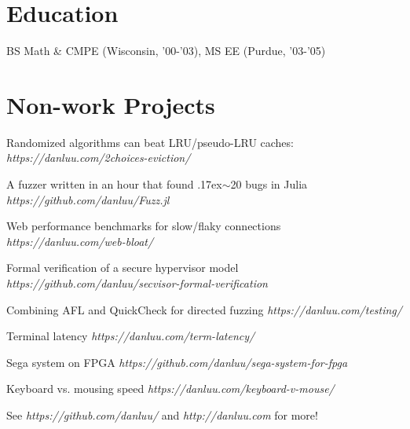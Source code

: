 \documentclass[letterpaper]{scrartcl}
\begin{document}
\section*{Education}
\begin{list1}
\item
  \begin{tabular1bold}BS Math \& CMPE (Wisconsin, '00-'03), MS EE (Purdue, '03-'05)\end{tabular1bold}
\end{list1}

\section*{Non-work Projects}
\begin{list1}
\item
  \begin{list2}
    \item Randomized algorithms can beat LRU/pseudo-LRU caches:  \hfill \emph{https://danluu.com/2choices-eviction/}
    \item A fuzzer written in an hour that found {\raise.17ex\hbox{$\scriptstyle\mathtt{\sim}$}}20 bugs in Julia \hfill \emph{https://github.com/danluu/Fuzz.jl}
    \item Web performance benchmarks for slow/flaky connections \hfill \emph{https://danluu.com/web-bloat/}
    \item Formal verification of a secure hypervisor model \hfill \emph{https://github.com/danluu/secvisor-formal-verification}
    \item Combining AFL and QuickCheck for directed fuzzing \hfill \emph{https://danluu.com/testing/}
    \item Terminal latency \hfill \emph{https://danluu.com/term-latency/}
    \item Sega system on FPGA \hfill \emph{https://github.com/danluu/sega-system-for-fpga}
    \item Keyboard vs. mousing speed \hfill \emph{https://danluu.com/keyboard-v-mouse/}
    \item See \emph{https://github.com/danluu/} and \emph{http://danluu.com} for more!
  \end{list2}
\end{list1}
\end{document}
